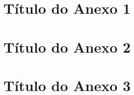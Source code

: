 \begin{anexosenv}


\chapter{Título do Anexo 1}

\chapter{Título do Anexo 2}

\chapter{Título do Anexo 3}

\end{anexosenv}